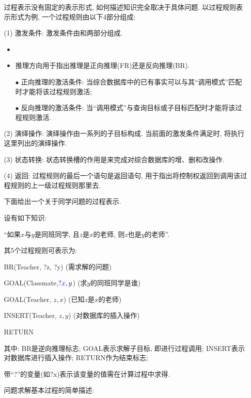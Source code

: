 过程表示没有固定的表示形式, 如何描述知识完全取决于具体问题. 以过程规则表示形式为例, 一个过程规则由以下4部分组成:

(1) 激发条件: 激发条件由和两部分组成.
\begin{itemize}
\item
\item 推理方向用于指出推理是正向推理(FR)还是反向推理(BR).

    $\bullet$ 正向推理的激活条件: 当综合数据库中的已有事实可以与其“调用模式”匹配时才能将该过程规则激活;

    $\bullet$ 反向推理的激活条件: 当“调用模式”与查询目标或子目标匹配时才能将该过程规则激活.
\end{itemize}

(2) 演绎操作: 演绎操作由一系列的子目标构成. 当前面的激发条件满足时, 将执行这里列出的演绎操作.

(3) 状态转换: 状态转换槽的作用是来完成对综合数据库的增、删和改操作.

(4) 返回: 过程规则的最后一个语句是返回语句, 用于指出将控制权返回到调用该过程规则的上一级过程规则那里去.
\begin{example}
下面给出一个关于同学问题的过程表示.

     设有如下知识:
    \begin{center}
        “如果$x$与$y$是同班同学, 且$z$是$x$的老师,  则$z$也是$y$的老师”.
    \end{center}

    其5个过程规则可表示为:

        \quad{} BR(Teacher, \textcolor[rgb]{0,0,1}{?z, ?y})          (需求解的问题)

        \quad{} GOAL(Classmate,$\textcolor[rgb]{0,0,1}{?x}, y$)     (求$y$的同班同学是谁)

        \quad{} GOAL(Teacher, $z, x$)        (已知$z$是$x$的老师)

        \quad{} INSERT(Teacher,  $z, y$)     (对数据库的插入操作)

        \quad{} \textcolor[rgb]{1,0,1}{RETURN}

其中: BR是逆向推理标志; GOAL表示求解子目标, 即进行过程调用; INSERT表示对数据库进行插入操作; RETURN作为结束标志;

\begin{remark}
    带“?”的变量(如?x)表示该变量的值需在计算过程中求得.
\end{remark}
\end{example}
问题求解基本过程的简单描述:

